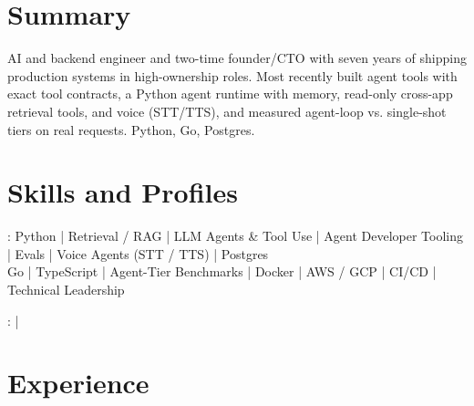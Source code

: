 \documentclass[print]{jack-resume}
\begin{document}
\pagecolor{darkmodeBackground}


\begin{minipage}[t][1cm][t]{.03\textwidth}
    \hfill
\end{minipage}

\section{Summary}
AI and backend engineer and two-time founder/CTO with seven years of shipping production systems in high-ownership roles. Most recently built agent tools with exact tool contracts, a Python agent runtime with memory, read-only cross-app retrieval tools, and voice (STT/TTS), and measured agent-loop vs. single-shot tiers on real requests. Python, Go, Postgres.
\sectionsep

\section{Skills and Profiles}
:
Python \hfill | \hfill
Retrieval / RAG \hfill | \hfill
LLM Agents \& Tool Use \hfill | \hfill
Agent Developer Tooling \hfill | \hfill
Evals \hfill | \hfill
Voice Agents (STT / TTS) \hfill | \hfill
Postgres \\
\hspace{1.0cm} Go \hfill | \hfill
TypeScript \hfill | \hfill
Agent-Tier Benchmarks \hfill | \hfill
Docker \hfill | \hfill
AWS / GCP \hfill | \hfill
CI/CD \hfill | \hfill
Technical Leadership \\

\raggedright{
    :
      \href{https://www.linkedin.com/in/jack-sturtevant/}{ \ExternalLink} |
     \href{https://github.com/jacksturt}{ \ExternalLink}}

\section{Experience}
\end{document}
